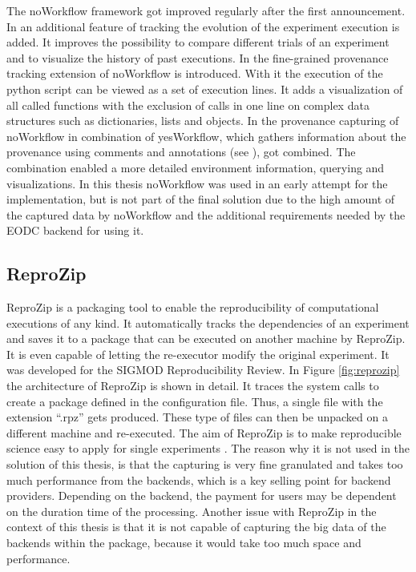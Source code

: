 \documentclass[draft,final]{vutinfth} %
\begin{document}
The noWorkflow framework got improved regularly after the first announcement. In \cite{Pimentel2016TrackingAA} an additional feature of tracking the evolution of the experiment execution is added. It improves the possibility to compare different trials of an experiment and to visualize the history of past executions. In \cite{Pimentel:2016:FPC:3090188.3090214} the fine-grained provenance tracking extension of noWorkflow is introduced. With it the execution of the python script can be viewed as a set of execution lines. It adds a visualization of all called functions with the exclusion of calls in one line on complex data structures such as dictionaries, lists and objects. In \cite{69bac1252a684629baa43b48e350068d} the provenance capturing of noWorkflow in combination of yesWorkflow, which gathers information about the provenance using comments and annotations (see \cite{192094}), got combined. The combination enabled a more detailed environment information, querying and visualizations. 
In this thesis noWorkflow was used in an early attempt for the implementation, but is not part of the final solution due to the high amount of the captured data by noWorkflow and the additional requirements needed by the EODC backend for using it.

\subsection{ReproZip}\label{ReproZip}
ReproZip is a packaging tool to enable the reproducibility of computational executions of any kind. It automatically tracks the dependencies of an experiment and saves it to a package that can be executed on another machine by ReproZip. It is even capable of letting the re-executor modify the original experiment. It was developed for the SIGMOD Reproducibility Review. In Figure \ref{fig:reprozip} the architecture of ReproZip is shown in detail. It traces the system calls to create a package defined in the configuration file. Thus, a single file with the extension “.rpz” gets produced. These type of files can then be unpacked on a different machine and re-executed. The aim of ReproZip is to make reproducible science easy to apply for single experiments \cite{29c5846926a4497d95f276604cb0368c}. The reason why it is not used in the solution of this thesis, is that the capturing is very fine granulated and takes too much performance from the backends, which is a key selling point for backend providers. Depending on the backend, the payment for users may be dependent on the duration time of the processing. Another issue with ReproZip in the context of this thesis is that it is not capable of capturing the big data of the backends within the package, because it would take too much space and performance.  
\end{document}
